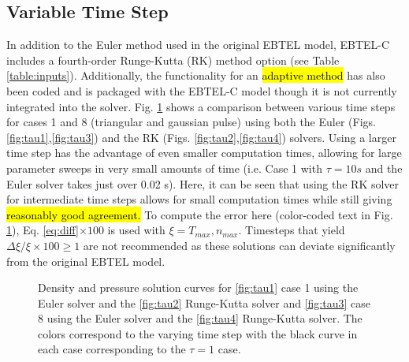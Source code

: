 \documentclass[preprint,10pt]{aastex}
\newcommand{\figex}{/Users/willbarnes/Documents/Rice/Research/EBTEL_figures/}
\begin{document}
\subsection{Variable Time Step}
In addition to the Euler method used in the original EBTEL model, EBTEL-C includes a fourth-order Runge-Kutta (RK) method option (see Table \ref{table:inputs}). Additionally, the functionality for an \hl{adaptive method} has also been coded and is packaged with the EBTEL-C model though it is not currently integrated into the solver. Fig. \ref{fig:var_tau} shows a comparison between various time steps for cases 1 and 8 (triangular and gaussian pulse) using both the Euler (Figs. \ref{fig:tau1},\ref{fig:tau3}) and the RK (Figs. \ref{fig:tau2},\ref{fig:tau4}) solvers. Using a larger time step has the advantage of even smaller computation times, allowing for large parameter sweeps in very small amounts of time (i.e. Case 1 with $\tau=10 s$ and the Euler solver takes just over 0.02 s). Here, it can be seen that using the RK solver for intermediate time steps allows for small computation times while still giving \hl{reasonably good agreement.} To compute the error here (color-coded text in Fig. \ref{fig:var_tau}), Eq. \ref{eq:diff}$\times100$ is used with $\xi=T_{max},n_{max}$. Timesteps that yield $\Delta\xi/\xi\times100 \ge 1$ are not recommended as these solutions can deviate significantly from the original EBTEL model.
\begin{figure}[]
\centering
{}
\caption{Density and pressure solution curves for \ref{fig:tau1} case 1 using the Euler solver and the \ref{fig:tau2} Runge-Kutta solver and \ref{fig:tau3} case 8 using the Euler solver and the \ref{fig:tau4} Runge-Kutta solver. The colors correspond to the varying time step with the black curve in each case corresponding to the $\tau=1$ case.}
\label{fig:var_tau}
\end{figure}
%
\end{document}
